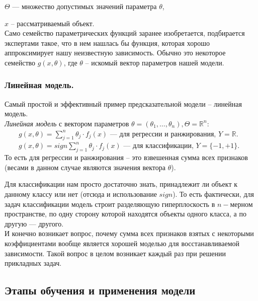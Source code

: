 \documentclass{article}
\begin{document}
$\Theta $ --- множество допустимых значений параметра $\theta$,

$x$ -- рассматриваемый объект.
\\

Само семейство параметрических функций заранее изобретается, подбирается экспертами такое, что в нем нашлась бы функция, которая хорошо аппроксимирует нашу неизвестную зависимость. Обычно это некоторое семейство $g(x, \theta)$, где $\theta$ -- искомый вектор параметров нашей модели.

\subsubsection{Линейная модель.}

Самый простой и эффективный пример предсказательной модели -- линейная модель.
\\

\textit{Линейная модель} с вектором параметров $\theta = (\theta_1, \ldots, \theta_n), \Theta = \mathbb{R}^n$:
\\

$\qquad g(x, \theta) = \sum\limits_{j = 1}^n \theta_j \cdot f_j(x)$ --- для регрессии и ранжирования, $Y = \mathbb{R}$.
\\

$\qquad g(x, \theta) = sign\sum\limits_{j = 1}^n \theta_j \cdot f_j(x)$ --- для классификации, $Y = \{-1, +1\}$.
\\
 
То есть для регрессии и ранжирования -- это взвешенная сумма всех признаков (весами в данном случае являются значения вектора $\theta$).

Для классификации нам просто достаточно знать, принадлежит ли объект к данному классу или нет (отсюда и использование $sign$). То есть фактически, для задач классификации модель строит разделяющую гиперплоскость в $n-$мерном пространстве, по одну сторону которой находятся объекты одного класса, а по другую --- другого.
\\

И конечно возникает вопрос, почему сумма всех признаков взятых с некоторыми коэффициентами вообще является хорошей моделью для восстанавливаемой зависимости. Такой вопрос в целом возникает каждый раз при решении прикладных задач.

\subsection{Этапы обучения и применения модели}
\end{document}
